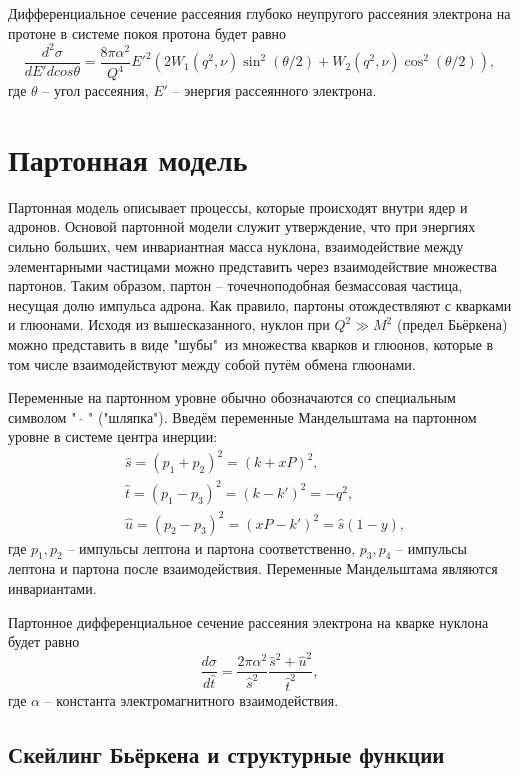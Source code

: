 \documentclass{extarticle}
\begin{document}
Дифференциальное сечение рассеяния глубоко неупругого рассеяния электрона на протоне в системе покоя протона будет равно
\begin{equation}
	\frac{d^2\sigma}{dE' d cos\theta} = \frac{8\pi \alpha^2}{Q^4} E'^2 (2W_1(q^2, \nu) \sin^2 (\theta /2) + W_2 (q^2, \nu) \cos^2 (\theta/2)),
\end{equation}
где $\theta$ -- угол рассеяния, $E'$ -- энергия рассеянного электрона.
\newpage
\section{Партонная модель}
Партонная модель описывает процессы, которые происходят внутри ядер и адронов. Основой партонной модели служит утверждение, что при энергиях сильно больших, чем инвариантная масса нуклона, взаимодействие между элементарными частицами можно представить через взаимодействие множества партонов. Таким образом, партон -- точечноподобная безмассовая частица, несущая долю импульса адрона. Как правило, партоны отождествляют с кварками и глюонами. 
Исходя из вышесказанного, нуклон при $Q^2 \gg M^2$ (предел Бьёркена) можно представить в виде "шубы"\ из множества кварков и глюонов, которые в том числе взаимодействуют между собой путём обмена глюонами.


Переменные на партонном уровне обычно обозначаются со специальным символом "\ $\hat{}$ " ("шляпка"). Введём переменные Мандельштама на партонном уровне в системе центра инерции:
\begin{equation}
\begin{split}
	& \hat{s} = (p_1+p_2)^2 = (k + xP)^2, \\
	& \hat{t} = (p_1-p_3)^2 = (k-k')^2 = -q^2, \\
	& \hat{u} = (p_2-p_3)^2 =(xP-k')^2= \hat{s} (1-y),
\end{split}
\end{equation}
где $p_1, p_2$ -- импульсы лептона и партона соответственно, $p_3, p_4$ -- импульсы лептона и партона после взаимодействия. Переменные Мандельштама являются инвариантами. 

Партонное дифференциальное сечение рассеяния электрона на кварке нуклона будет равно
\begin{equation}
	\frac{d\sigma}{d\hat{t}} = \frac{2\pi \alpha^2}{\hat{s}^2} \frac{\hat{s}^2 + \hat{u}^2}{\hat{t}^2},
\end{equation}
где $\alpha$ -- константа электромагнитного взаимодействия. 

\subsection{Скейлинг Бьёркена и структурные функции}
\end{document}

